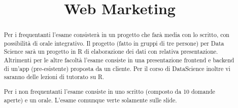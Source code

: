 \documentclass[11pt]{article}
\title{\textbf{Web Marketing}}
\author{}
\date{}
\begin{document}
\maketitle
\begin{abstract}
  Per i frequentanti l'esame consisterà in un progetto che farà media con lo scritto, con possibilità di orale integrativo.
  Il progetto (fatto in gruppi di tre persone) per Data Science sarà un progetto in R di elaborazione dei dati con relativa presentazione.
  Altrimenti per le altre facoltà l'esame consiste in una presentazione frontend e backend di un'app (pre-esistente) proposta da un cliente.
  Per il corso di DataScience inoltre vi saranno delle lezioni di tutorato su R.
  
  Per i non frequentanti l'esame consiste in uno scritto (composto da 10 domande aperte) e un orale.
  L'esame comunque verte solamente sulle slide.
\end{abstract}
\end{document}

